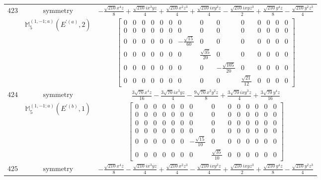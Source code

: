 \documentclass[fleqn,8pt,landscape]{jsarticle}
\begin{document}
\begin{longtable}{ccc}
$ 423 $ & $ \text{symmetry} $ & $ - \frac{\sqrt{210} x^{4} z}{8} + \frac{\sqrt{210} i x^{3} y z}{4} + \frac{\sqrt{210} x^{2} z^{3}}{4} + \frac{\sqrt{210} i x y^{3} z}{4} - \frac{\sqrt{210} i x y z^{3}}{2} + \frac{\sqrt{210} y^{4} z}{8} - \frac{\sqrt{210} y^{2} z^{3}}{4} $ \\
$  $ & $ \mathbb{M}_{5}^{(1,-1;a)}(E^{\prime(a)},2) $ & $ \begin{bmatrix} 0 & 0 & 0 & 0 & 0 & 0 & 0 & 0 & 0 & 0 & 0 & 0 & 0 & 0 \\ 0 & 0 & 0 & 0 & 0 & 0 & 0 & 0 & 0 & 0 & 0 & 0 & 0 & 0 \\ 0 & 0 & 0 & 0 & 0 & 0 & - \frac{\sqrt{15}}{60} & 0 & 0 & 0 & 0 & 0 & 0 & 0 \\ 0 & 0 & 0 & 0 & 0 & 0 & 0 & \frac{\sqrt{35}}{20} & 0 & 0 & 0 & 0 & 0 & 0 \\ 0 & 0 & 0 & 0 & 0 & 0 & 0 & 0 & - \frac{\sqrt{105}}{20} & 0 & 0 & 0 & 0 & 0 \\ 0 & 0 & 0 & 0 & 0 & 0 & 0 & 0 & 0 & \frac{\sqrt{21}}{12} & 0 & 0 & 0 & 0 \end{bmatrix} $ \\ \hline
$ 424 $ & $ \text{symmetry} $ & $ \frac{3 \sqrt{70} x^{4} z}{16} - \frac{3 \sqrt{70} i x^{3} y z}{4} - \frac{9 \sqrt{70} x^{2} y^{2} z}{8} + \frac{3 \sqrt{70} i x y^{3} z}{4} + \frac{3 \sqrt{70} y^{4} z}{16} $ \\
$  $ & $ \mathbb{M}_{5}^{(1,-1;a)}(E^{\prime(b)},1) $ & $ \begin{bmatrix} 0 & 0 & 0 & 0 & 0 & 0 & 0 & 0 & 0 & 0 & 0 & 0 & 0 & 0 \\ 0 & 0 & 0 & 0 & 0 & 0 & 0 & 0 & 0 & 0 & 0 & 0 & 0 & 0 \\ 0 & 0 & 0 & 0 & 0 & 0 & 0 & 0 & 0 & 0 & 0 & 0 & 0 & 0 \\ 0 & 0 & 0 & 0 & 0 & 0 & 0 & 0 & 0 & 0 & 0 & 0 & 0 & 0 \\ 0 & 0 & 0 & 0 & 0 & 0 & - \frac{\sqrt{15}}{10} & 0 & 0 & 0 & 0 & 0 & 0 & 0 \\ 0 & 0 & 0 & 0 & 0 & 0 & 0 & \frac{\sqrt{35}}{10} & 0 & 0 & 0 & 0 & 0 & 0 \end{bmatrix} $ \\ \hline
$ 425 $ & $ \text{symmetry} $ & $ - \frac{\sqrt{210} x^{4} z}{8} - \frac{\sqrt{210} i x^{3} y z}{4} + \frac{\sqrt{210} x^{2} z^{3}}{4} - \frac{\sqrt{210} i x y^{3} z}{4} + \frac{\sqrt{210} i x y z^{3}}{2} + \frac{\sqrt{210} y^{4} z}{8} - \frac{\sqrt{210} y^{2} z^{3}}{4} $ \\

\end{longtable}
\end{document}
